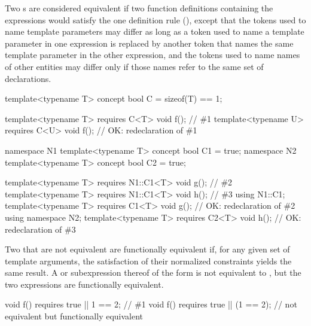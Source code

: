 \pnum
Two s are 
considered equivalent if two function definitions containing the 
expressions would satisfy the one definition rule 
(), except that
the tokens used to name template parameters may differ as long as a 
token used to name a template parameter in one expression is replaced by 
another token that names the same template parameter in the other 
expression, and the tokens used to name names of other entities may 
differ only if those names refer to the same set of declarations.
% 
\enterexample
\begin{codeblock}
template<typename T> concept bool C = sizeof(T) == 1;

template<typename T> requires C<T> void f(); // \#1
template<typename U> requires C<U> void f(); // OK: redeclaration of \#1

namespace N1 { template<typename T> concept bool C1 = true; }
namespace N2 { template<typename T> concept bool C2 = true; }

template<typename T> requires N1::C1<T> void g(); // \#2
template<typename T> requires N1::C1<T> void h(); // \#3
using N1::C1;
template<typename T> requires C1<T> void g();     // OK: redeclaration of \#2
using namespace N2;
template<typename T> requires C2<T> void h();     // OK: redeclaration of \#3
\end{codeblock}
\exitexample
% 
Two  that are not 
equivalent are functionally equivalent if, for any given set of template 
arguments, the satisfaction of their normalized constraints yields the
same result.
% 
A  or
subexpression thereof of the form  is not equivalent to
, but the two expressions are functionally equivalent. 
\enterexample
\begin{codeblock}
void f() requires true || 1 == 2;   // \#1
void f() requires true || (1 == 2); // not equivalent but functionally equivalent
\end{codeblock}
\exitexample
